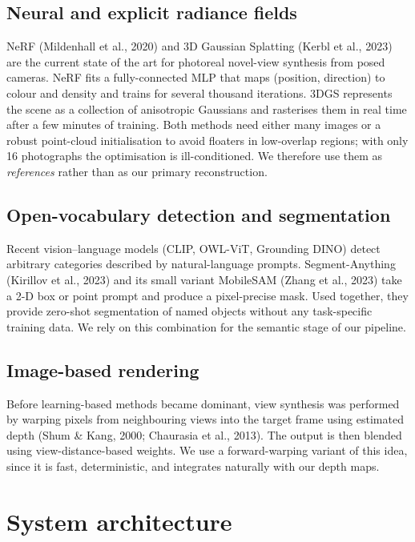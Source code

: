 \documentclass[11pt,a4paper]{article}
\begin{document}
\subsection{Neural and explicit radiance fields}

NeRF (Mildenhall et al., 2020) and 3D Gaussian Splatting (Kerbl et al., 2023) are the current state of the art for photoreal novel-view synthesis from posed cameras. NeRF fits a fully-connected MLP that maps (position, direction) to colour and density and trains for several thousand iterations. 3DGS represents the scene as a collection of anisotropic Gaussians and rasterises them in real time after a few minutes of training. Both methods need either many images or a robust point-cloud initialisation to avoid floaters in low-overlap regions; with only 16 photographs the optimisation is ill-conditioned. We therefore use them as \textit{references} rather than as our primary reconstruction.

\subsection{Open-vocabulary detection and segmentation}

Recent vision–language models (CLIP, OWL-ViT, Grounding DINO) detect arbitrary categories described by natural-language prompts. Segment-Anything (Kirillov et al., 2023) and its small variant MobileSAM (Zhang et al., 2023) take a 2-D box or point prompt and produce a pixel-precise mask. Used together, they provide zero-shot segmentation of named objects without any task-specific training data. We rely on this combination for the semantic stage of our pipeline.

\subsection{Image-based rendering}

Before learning-based methods became dominant, view synthesis was performed by warping pixels from neighbouring views into the target frame using estimated depth (Shum \& Kang, 2000; Chaurasia et al., 2013). The output is then blended using view-distance-based weights. We use a forward-warping variant of this idea, since it is fast, deterministic, and integrates naturally with our depth maps.

\section{System architecture}
\end{document}
